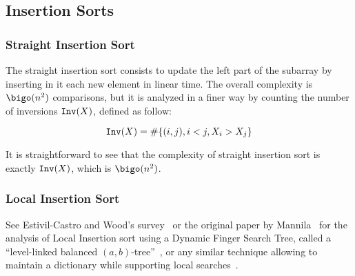 \subsection{Insertion Sorts}
\label{sec:insertion-sorts}



\subsubsection{Straight Insertion Sort}
\label{sec:stra-insert-sort}

The straight insertion sort consists to update the left part of the
subarray by inserting in it each new element in linear time. 
%
The overall complexity is $\bigo(n^2)$ comparisons, but it is analyzed
in a finer way by counting the number of inversions $\mathtt{Inv}(X)$,
defined as follow:

$$\mathtt{Inv}(X)=\#\{(i,j), i<j, X_i > X_j\}$$

It is straightforward to see that the complexity of straight insertion
sort is exactly $\mathtt{Inv}(X)$, which is $\bigo(n^2)$.

\subsubsection{Local Insertion Sort}
\label{sec:local-insertion-sort}

See Estivil-Castro and Wood's survey~\cite[page
5,6]{estivillcastro92survey} or the original paper by
Mannila~\cite{measuresOfPresortednessAndOptimalSortingAlgorithms} for
the analysis of Local Insertion sort using a Dynamic Finger Search
Tree, called a ``level-linked balanced
$(a,b)$-tree''~\cite{designAndAnalysisOfADataStructureForRepresentingSortedLists},
or any similar technique allowing to maintain a dictionary while
supporting local
searches~\cite{aNewRepresentationForLinearLists,fingerSearchTreesWithConstantInsertionTime,distancesAndFingerSearchInRandomBinarySearchTrees,spaceEfficientFingerSearchOnDegreeBalancedSearchTrees}.

